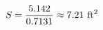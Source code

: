 \documentclass[preview]{standalone}
\begin{document}
\begin{align*}
\special{dvisvgm:raw <g id='unique000'>}S = \frac{5.142}{0.7131} \approx 7.21 \ \text{ft}^2\special{dvisvgm:raw </g>}
\end{align*}
\end{document}
